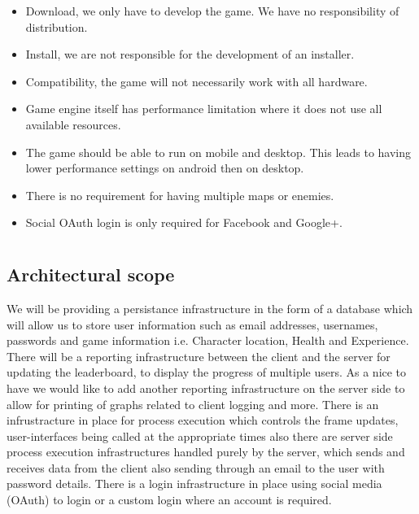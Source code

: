 \documentclass[letterpaper]{article}
\begin{document}
		\begin{itemize}
  		\item Download, we only have to develop the game. We have no responsibility of distribution.
  		\item Install, we are not responsible for the development of an installer.
  		\item Compatibility, the game will not necessarily work with all hardware.
  		\item Game engine itself has performance limitation where it does not use all available resources.
  		\item The game should be able to run on mobile and desktop. This leads to having lower performance settings on android then on desktop.
  		\item There is no requirement for having multiple maps or enemies.
  		\item Social OAuth login is only required for Facebook and Google+.
		\end{itemize}
		
		\section*{\colorbox{blue}{}} 
		\vspace{0.1in}
			
			\subsection*{ Architectural scope }
			\vspace{0.1in}	
			We will be providing a persistance infrastructure in the form of a database which will allow us to store user information such as email addresses, usernames, passwords and game information i.e. Character location, Health and Experience. There will be a reporting infrastructure between the client and the server for updating the leaderboard, to display the progress of multiple users. As a nice to have we would like to add another reporting infrastructure on the server side to allow for printing of graphs related to client logging and more. There is an infrustracture in place for process execution which controls the frame updates, user-interfaces being called at the appropriate times also there are server side process execution infrastructures handled purely by the server, which sends and receives data from the client also sending through an email to the user with password details. There is a login infrastructure in place using social media (OAuth) to login or a custom login where an account is required. 
				
\end{document}
